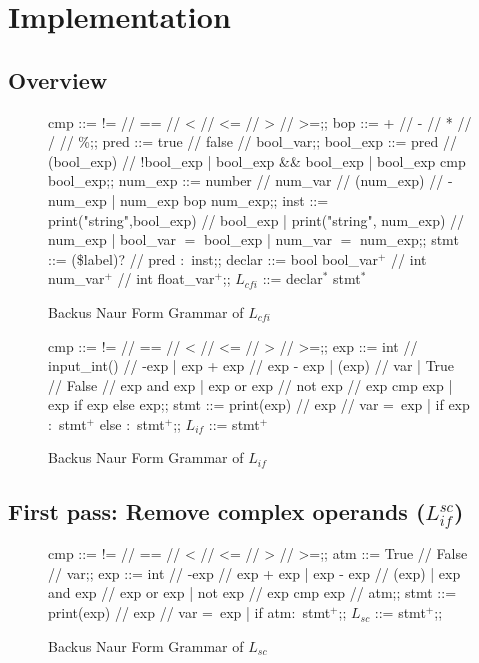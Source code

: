 \section{Implementation}

\subsection{Overview}
\lipsum[1]

\begin{figure}[h]
	\centering
	\begin{bnf}[row{-} = {bg = gray9}]
		cmp ::= != // == // < // <= // > // >=;;
		bop ::= + // - // * // / // \%;;
		pred ::= true // false // bool\_var;;
		bool\_exp ::= pred // (bool\_exp) // !bool\_exp
		| bool\_exp \&\& bool\_exp
		| bool\_exp cmp bool\_exp;;
		num\_exp ::= number // num\_var // (num\_exp) // -num\_exp
		| num\_exp bop num\_exp;;
		inst ::= print("string",bool\_exp) // bool\_exp
		| print("string", num\_exp) // num\_exp
		| bool\_var $=$ bool\_exp
		| num\_var $=$ num\_exp;;
		stmt ::= (\$label)? // pred $\colon$ inst;;
		declar ::= bool bool\_var$^+$ // int num\_var$^+$ // int float\_var$^+$;;
		$L_{cfi}$ ::= declar$^*$ stmt$^*$
	\end{bnf}
	\caption{Backus Naur Form Grammar of $L_{cfi}$}
	\label{lcfi}
\end{figure}

\begin{figure}[h]
	\centering
	\begin{bnf}[row{-} = {bg = gray9}]
		cmp ::= != // == // < // <= // > // >=;;
		exp ::= int // input\_int() // -exp
		| exp + exp // exp - exp
		| (exp) // var
		| True // False // exp and exp
		| exp or exp // not exp // exp cmp exp
		| exp if exp else exp;;
		stmt ::= print(exp) // exp // var = exp
		| if exp $\colon$ stmt$^+$ else $\colon$ stmt$^+$;;
		$L_{if}$ ::= stmt$^+$
	\end{bnf}
	\caption{Backus Naur Form Grammar of $L_{if}$}
	\label{lif}
\end{figure}

\subsection{First pass: Remove complex operands ($L_{if}^{sc}$)}

\begin{figure}[h!]
	\centering
	\begin{bnf}[row{-} = {bg = gray9}]
		cmp ::= != // == // < // <= // > // >=;;
		atm ::= True // False // var;;
		exp ::= int  // -exp // exp + exp 
		| exp - exp // (exp)
		| exp and exp // exp or exp 
		| not exp // exp cmp exp // atm;;
		stmt ::= print(exp) // exp // var = exp
		| if atm$\colon$ stmt$^+$;;
		$L_{sc}$ ::= stmt$^+$;;
	\end{bnf}
	\caption{Backus Naur Form Grammar of $L_{sc}$}
	\label{sc}
\end{figure}

